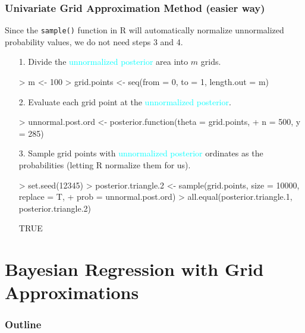\documentclass[handout]{beamer}
\begin{document}
\begin{frame}[fragile]
\frametitle{Univariate Grid Approximation Method (easier way)}
\pause

Since the {\tt sample()} function in R will automatically normalize
unnormalized probability values, we do not need steps 3 and 4.
\bigskip
\pause
\begin{itemize}
\item[1.] Divide the \textcolor{cyan}{unnormalized posterior} area into $m$ grids.
\pause
\medskip
\tiny
\begin{Schunk}
\begin{Sinput}
> m <- 100
> grid.points <- seq(from = 0, to = 1, length.out = m)
\end{Sinput}
\end{Schunk}
\bigskip
\normalsize
\pause
\item[2.] Evaluate each grid point at the \textcolor{cyan}{unnormalized posterior}.
\pause
\medskip
\tiny
\begin{Schunk}
\begin{Sinput}
> unnormal.post.ord <- posterior.function(theta = grid.points, 
+     n = 500, y = 285)
\end{Sinput}
\end{Schunk}
\bigskip
\pause
\normalsize
\item[3.] Sample grid points with \textcolor{cyan}{unnormalized posterior} ordinates as
the probabilities (letting R normalize them for us).
\medskip
\pause
\tiny
\begin{Schunk}
\begin{Sinput}
> set.seed(12345)
> posterior.triangle.2 <- sample(grid.points, size = 10000, replace = T, 
+     prob = unnormal.post.ord)
> all.equal(posterior.triangle.1, posterior.triangle.2)
\end{Sinput}
\begin{Soutput}
[1] TRUE
\end{Soutput}
\end{Schunk}
\end{itemize}
\end{frame}


\section{Bayesian Regression with Grid Approximations}

\begin{frame}
\frametitle{Outline}
\tableofcontents[currentsection]
\end{frame}
\end{document}
